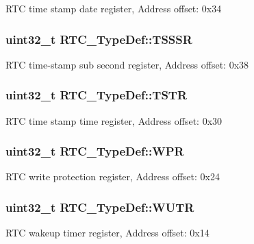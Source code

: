 R\-T\-C time stamp date register, Address offset\-: 0x34 \hypertarget{struct_r_t_c___type_def_a1e8b4b987496ee1c0c6f16b0a94ea1a1}{
\subsubsection[{T\-S\-S\-S\-R}]{ uint32\-\_\-t R\-T\-C\-\_\-\-Type\-Def\-::\-T\-S\-S\-S\-R}}\label{struct_r_t_c___type_def_a1e8b4b987496ee1c0c6f16b0a94ea1a1}
R\-T\-C time-\/stamp sub second register, Address offset\-: 0x38 \hypertarget{struct_r_t_c___type_def_a1ddbb2a5eaa54ff43835026dec99ae1c}{
\subsubsection[{T\-S\-T\-R}]{ uint32\-\_\-t R\-T\-C\-\_\-\-Type\-Def\-::\-T\-S\-T\-R}}\label{struct_r_t_c___type_def_a1ddbb2a5eaa54ff43835026dec99ae1c}
R\-T\-C time stamp time register, Address offset\-: 0x30 \hypertarget{struct_r_t_c___type_def_ad54765af56784498a3ae08686b79a1ff}{
\subsubsection[{W\-P\-R}]{ uint32\-\_\-t R\-T\-C\-\_\-\-Type\-Def\-::\-W\-P\-R}}\label{struct_r_t_c___type_def_ad54765af56784498a3ae08686b79a1ff}
R\-T\-C write protection register, Address offset\-: 0x24 \hypertarget{struct_r_t_c___type_def_ad93017bb0a778a2aad9cd71211fc770a}{
\subsubsection[{W\-U\-T\-R}]{ uint32\-\_\-t R\-T\-C\-\_\-\-Type\-Def\-::\-W\-U\-T\-R}}\label{struct_r_t_c___type_def_ad93017bb0a778a2aad9cd71211fc770a}
R\-T\-C wakeup timer register, Address offset\-: 0x14 

